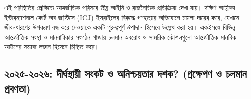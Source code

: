 এই পরিস্থিতির প্রেক্ষিতে আন্তর্জাতিক পরিসরে তীব্র আইনি ও রাজনৈতিক প্রতিক্রিয়া
দেখা যায়। দক্ষিণ আফ্রিকা ইন্টারন্যাশনাল কোর্ট অব জাস্টিসে (ICJ) ইসরাইলের
বিরুদ্ধে গণহত্যার অভিযোগে মামলা দায়ের করে, যেখানে জীবনধারণের উপকরণ বন্ধ করে
দেওয়াকে একটি গুরুত্বপূর্ণ উপাদান হিসেবে উল্লেখ করা হয়। একইসঙ্গে বিভিন্ন
আন্তর্জাতিক সংস্থা ও মানবাধিকার সংগঠন গাজায় চলমান অবরোধ ও সামরিক কৌশলগুলো
আন্তর্জাতিক মানবিক আইনের সম্ভাব্য লঙ্ঘন হিসেবে চিহ্নিত করে।
\vspace{0.3em}

\subsection{২০২৫-২০২৬: দীর্ঘস্থায়ী সংকট ও অনিশ্চয়তার দশক? (প্রক্ষেপণ ও
চলমান
প্রবণতা)}\label{ux9a6ux9b0ux998ux9b8ux9a5ux9af-ux9b8ux995ux99f-ux993-ux985ux9a8ux9b6ux99aux9afux9a4ux9b0-ux9a6ux9b6ux995-ux9aaux9b0ux995ux9b7ux9aaux9a3-ux993-ux99aux9b2ux9aeux9a8-ux9aaux9b0ux9acux9a3ux9a4}

